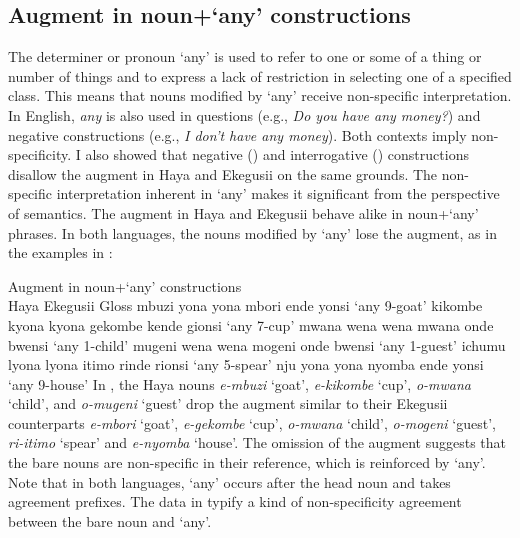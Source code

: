 \documentclass[output=paper]{langscibook}
\begin{document}
\subsection{Augment in noun+`any’ constructions}
The determiner or pronoun ‘any’ is used to refer to one or some of a thing or number of things and to express a lack of restriction in selecting one of a specified class. This means that nouns modified by ‘any’ receive non-specific interpretation. In English, \textit{any} is also used in questions (e.g., \textit{Do you have any money?}) and negative constructions (e.g., \textit{I don’t have any money}). Both contexts imply non-specificity. I also showed that negative () and interrogative () constructions disallow the augment in Haya and Ekegusii on the same grounds. The non-specific interpretation inherent in ‘any’ makes it significant from the perspective of semantics. The augment in Haya and Ekegusii behave alike in noun+‘any’ phrases. In both languages, the nouns modified by ‘any’ lose the augment, as in the examples in :

\ea Augment in noun+‘any’ constructions\smallskip\\
\label{hayagusii29}
             \hphantom{abc }Haya			\hphantom{nbe kyona kyona}\hspace{1ex}Ekegusii			\hphantom{ikende gionsi}Gloss
  \ea\label{hayagusii29a}	mbuzi yona yona\hphantom{yona}\hspace{1ex}		mbori ende yonsi\hphantom{ionsi}		‘any 9-goat’
  \ex\label{hayagusii29b}	kikombe kyona kyona\hspace{1ex} 	gekombe kende gionsi		‘any 7-cup’
  \ex\label{hayagusii29c}	mwana wena wena\hphantom{ina}\hspace{1ex}		mwana onde bwensi\hphantom{si}		‘any 1-child’
  \ex\label{hayagusii29d}	mugeni wena wena\hphantom{mt}\hspace{1ex} 		mogeni onde bwensi\hphantom{si}		‘any 1-guest’
  \ex\label{hayagusii29e}	ichumu lyona lyona\hphantom{na}\hspace{1ex}		itimo rinde rionsi\hphantom{ionsi}		‘any 5-spear’
  \ex\label{hayagusii29f}	nju yona yona\hphantom{a kyona}\hspace{1ex}			nyomba ende yonsi\hphantom{nsi}		‘any 9-house’
  \z
\z
In , the Haya nouns \textit{e-mbuzi} ‘goat’, \textit{e-kikombe} ‘cup’, \textit{o-mwana} ‘child’, and \textit{o-mugeni} ‘guest’ drop the augment similar to their Ekegusii counterparts \textit{e-mbori} ‘goat’, \textit{e-gekombe} ‘cup’, \textit{o-mwana} ‘child’, \textit{o-mogeni} ‘guest’, \textit{ri-itimo} ‘spear’ and \textit{e-nyomba} ‘house’. The omission of the augment suggests that the bare nouns are non-specific in their reference, which is reinforced by ‘any’. Note that in both languages, ‘any’ occurs after the head noun and takes agreement prefixes. The data in  typify a kind of non-specificity agreement between the bare noun and ‘any’.
\end{document}
